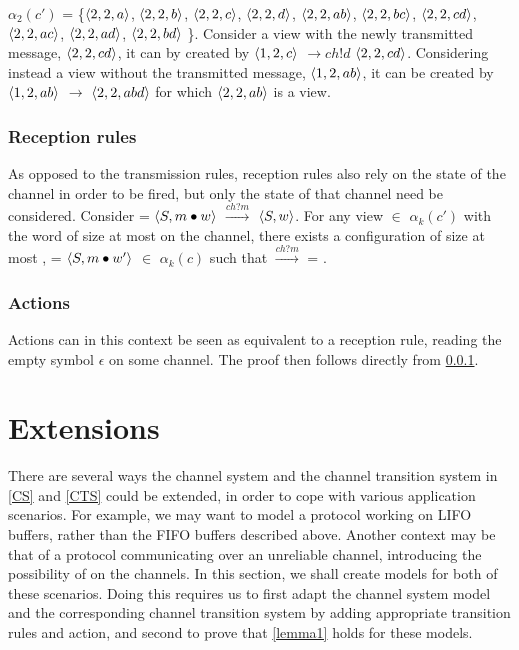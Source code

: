 $\alpha_2(c')$ = \{$\langle2,2,a\rangle$, $\langle2,2,b\rangle$, $\langle2,2,c\rangle$, $\langle2,2,d\rangle$, $\langle2,2,ab\rangle$, $\langle2,2,bc\rangle$, $\langle2,2,cd\rangle$, $\langle2,2,ac\rangle$, $\langle2,2,ad\rangle$, $\langle2,2,bd\rangle $ \}. Consider a view with the newly transmitted message, $\langle2,2,cd\rangle$, it can by created by $\langle1,2,c\rangle$ $\rightarrow{ch!d}$ $\langle2,2,cd\rangle$. Considering instead a view without the transmitted message, $\langle1,2,ab\rangle$, it can be created by $\langle1,2,ab\rangle$ $\rightarrow$ $\langle2,2,abd\rangle$ for which $\langle2,2,ab\rangle$ is a view.

\subsubsection{Reception rules}
\label{proofreception}
As opposed to the transmission rules, reception rules also rely on the state of the channel in order to be fired, but only the state of that channel need be considered. Consider  = $\langle S, m\bullet w\rangle$ $\xrightarrow{ch?m}$ $\langle S, w\rangle$. For any view  $\in$ $\alpha_k(c')$ with the word  of size at most  on the channel, there exists a configuration of size at most ,  = $\langle S, m\bullet w'\rangle$ $\in$ $\alpha_k(c)$ such that  $\xrightarrow{ch?m}$  = .

\subsubsection{Actions}
Actions can in this context be seen as equivalent to a reception rule, reading the empty symbol $\epsilon$ on some channel. The proof then follows directly from \ref{proofreception}.



\section{Extensions}
\label{extensions}
There are several ways the channel system and the channel transition system in \ref{CS} and \ref{CTS} could be extended, in order to cope with various application scenarios. For example, we may want to model a protocol working on LIFO buffers, rather than the FIFO buffers described above. Another context may be that of a protocol communicating over an unreliable channel, introducing the possibility of  on the channels. In this section, we shall create models for both of these scenarios. Doing this requires us to first adapt the channel system model and the corresponding channel transition system by adding appropriate transition rules and action, and second to prove that \ref{lemma1} holds for these models.

